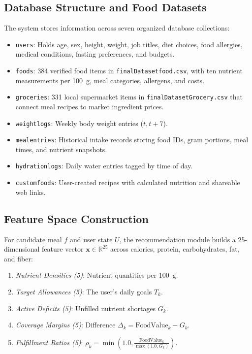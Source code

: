 \documentclass[10pt, conference, letterpaper]{IEEEtran}
\begin{document}
\subsection{Database Structure and Food Datasets}
The system stores information across seven organized database collections:
\begin{itemize}[leftmargin=*, nosep]
    \item \texttt{users}: Holds age, sex, height, weight, job titles, diet choices, food allergies, medical conditions, fasting preferences, and budgets.
    \item \texttt{foods}: 384 verified food items in \texttt{finalDatasetfood.csv}, with ten nutrient measurements per 100~g, meal categories, allergens, and costs.
    \item \texttt{groceries}: 331 local supermarket items in \texttt{finalDatasetGrocery.csv} that connect meal recipes to market ingredient prices.
    \item \texttt{weightlogs}: Weekly body weight entries ($t, t+7$).
    \item \texttt{mealentries}: Historical intake records storing food IDs, gram portions, meal times, and nutrient snapshots.
    \item \texttt{hydrationlogs}: Daily water entries tagged by time of day.
    \item \texttt{customfoods}: User-created recipes with calculated nutrition and shareable web links.
\end{itemize}

\subsection{Feature Space Construction}
For candidate meal $f$ and user state $U$, the recommendation module builds a 25-dimensional feature vector $\mathbf{x} \in \mathbb{R}^{25}$ across calories, protein, carbohydrates, fat, and fiber:
\begin{enumerate}[leftmargin=*, nosep]
    \item \textit{Nutrient Densities (5)}: Nutrient quantities per 100~g.
    \item \textit{Target Allowances (5)}: The user's daily goals $T_k$.
    \item \textit{Active Deficits (5)}: Unfilled nutrient shortages $G_k$.
    \item \textit{Coverage Margins (5)}: Difference $\Delta_k = \text{FoodValue}_k - G_k$.
    \item \textit{Fulfillment Ratios (5)}: $\rho_k = \min\left(1.0, \frac{\text{FoodValue}_k}{\max(1.0, G_k)}\right)$.
\end{enumerate}
\end{document}

